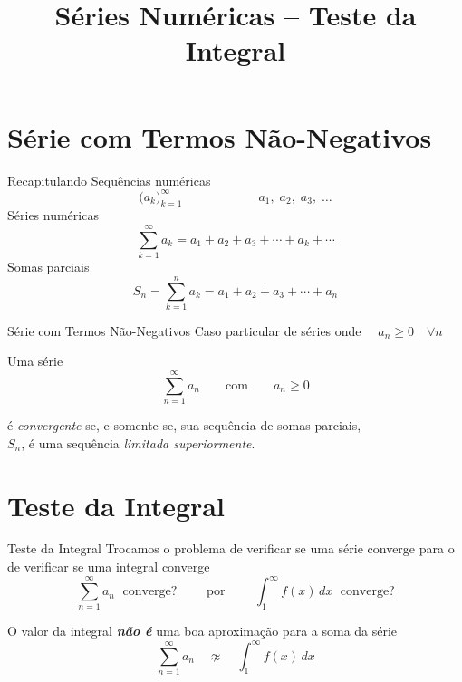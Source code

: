 \documentclass[fleqn,utf8,aspectratio=169,12pt]{beamer}
\title{Séries Numéricas -- Teste da Integral}
\begin{document}
\addtitle

\section{Série com Termos Não-Negativos}

\begin{frame}{Recapitulando}
  Sequências numéricas
  \[
    \big( a_k \big)_{k=1}^\infty \qquad\qquad\qquad a_1,\; a_2,\; a_3,\; \dots
  \]
  \pause
  Séries numéricas
  \[
    \sum_{k=1}^\infty a_k = a_1 + a_2 + a_3 + \cdots + a_k + \cdots
  \]
  \pause
  Somas parciais
  \[
    S_n = \sum_{k=1}^n a_k = a_1 + a_2 + a_3 + \cdots + a_n
  \]
\end{frame}

\begin{frame}{Série com Termos Não-Negativos}
  Caso particular de séries onde $\quad a_n \geq 0 \quad \forall n$

  \pause
  \bigskip
  Uma série
  \[\sum_{n=1}^\infty a_n \qquad \text{com} \qquad a_n\geq 0 \]

  \pause
  \bigskip
  é \emph{convergente} se, e somente se, sua sequência de somas parciais,  \\
  $S_n$, é uma sequência \emph{limitada superiormente}.
\end{frame}

\section{Teste da Integral}

\begin{frame}{Teste da Integral}
  Trocamos o problema de verificar se uma série converge para o de
  verificar se uma integral converge
  \[
    \sum_{n=1}^{\infty} a_n  \;\text{ converge?}
    \qquad \text{ por } \qquad
    \int_{1}^{\infty} f(x) \,dx  \;\text{ converge?}
  \]

  \pause
  O valor da integral \emph{\textbf{não é}} uma boa aproximação para a soma da série
  \[ \sum_{n=1}^{\infty} a_n  \quad \not\approx \quad \int_{1}^{\infty} f(x) \,dx\]
\end{frame}
\end{document}
